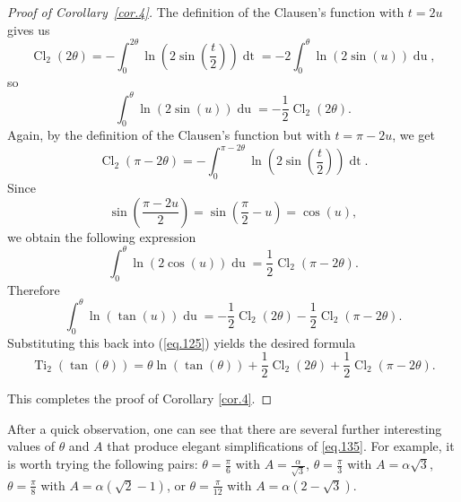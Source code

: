 \documentclass[preprint,12pt,nopreprintline]{elsarticle}
\begin{document}
\begin{proof}[Proof of Corollary~\ref{cor.4}]
The definition of the Clausen’s function with $t=2u$ gives us
\begin{equation}
\operatorname{Cl}_2\left(2\theta\right)=-\int_0^{2\theta}\operatorname{ln}\left(2\operatorname{sin}\left(\frac{t}{2}\right)\right)\operatorname{dt}=-2\int_0^{\theta}\operatorname{ln}\left(2\operatorname{sin}\left(u\right)\right)\operatorname{du},
\end{equation}
so
\begin{equation}
\int_0^{\theta}\operatorname{ln}\left(2\operatorname{sin}\left(u\right)\right)\operatorname{du}=-\frac{1}{2}\operatorname{Cl}_2\left(2\theta\right).
\end{equation}
Again, by the definition of the Clausen’s function but with $t=\pi-2u$, we get
\begin{equation}
\operatorname{Cl}_2\left(\pi-2\theta\right)=-\int_0^{\pi-2\theta}\operatorname{ln}\left(2\operatorname{sin}\left(\frac{t}{2}\right)\right)\operatorname{dt}.
\end{equation}
Since
\begin{equation}
\operatorname{sin}\left(\frac{\pi-2u}{2}\right)=\operatorname{sin}\left(\frac{\pi}{2}-u\right)=\operatorname{cos}\left(u\right),
\end{equation}
we obtain the following expression
\begin{equation}
\int_0^{\theta}\operatorname{ln}\left(2\operatorname{cos}\left(u\right)\right)\operatorname{du}=\frac{1}{2}\operatorname{Cl}_2\left(\pi-2\theta\right).
\end{equation}
Therefore
\begin{equation}
\int_0^{\theta}\operatorname{ln}\left(\operatorname{tan}\left(u\right)\right)\operatorname{du}=-\frac{1}{2}\operatorname{Cl}_2\left(2\theta\right)-\frac{1}{2}\operatorname{Cl}_2\left(\pi-2\theta\right).
\end{equation}
Substituting this back into (\ref{eq.125}) yields the desired formula
\begin{equation}\label{eq.135}
\operatorname{Ti}_2\left(\operatorname{tan}\left(\theta\right)\right)=\theta\operatorname{ln}\left(\operatorname{tan}\left(\theta\right)\right)+\frac{1}{2}\operatorname{Cl}_2\left(2\theta\right)+\frac{1}{2}\operatorname{Cl}_2\left(\pi-2\theta\right).
\end{equation}

This completes the proof of Corollary \ref{cor.4}.
\end{proof}

After a quick observation, one can see that there are several further interesting values of $\theta$ and $A$ that produce elegant simplifications of \ref{eq.135}. For example, it is worth trying the following pairs: $\theta=\frac{\pi}{6}$ with $A=\frac{\alpha}{\sqrt{3}}$, $\theta=\frac{\pi}{3}$ with $A=\alpha\sqrt{3}$, $\theta=\frac{\pi}{8}$ with $A=\alpha\left(\sqrt{2}-1\right)$, or $\theta=\frac{\pi}{12}$ with $A=\alpha\left(2-\sqrt{3}\right)$.
\end{document}
